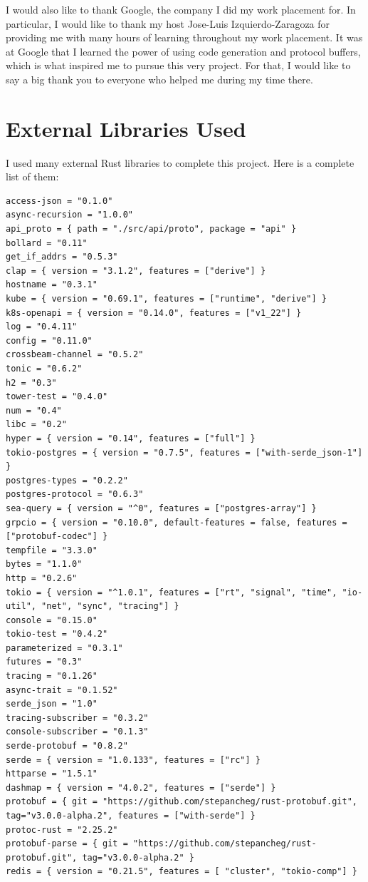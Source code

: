 \documentclass[a4paper,12pt]{report}
\begin{document}
I would also like to thank Google, the company I did my work placement for.
In particular, I would like to thank my host Jose-Luis Izquierdo-Zaragoza for providing me with many hours of learning throughout my work placement.
It was at Google that I learned the power of using code generation and protocol buffers, which is what inspired me to pursue this very project.
For that, I would like to say a big thank you to everyone who helped me during my time there.

\chapter*{External Libraries Used}
I used many external Rust libraries to complete this project. Here is a complete list of them:

\begin{lstlisting}
access-json = "0.1.0"
async-recursion = "1.0.0"
api_proto = { path = "./src/api/proto", package = "api" }
bollard = "0.11"
get_if_addrs = "0.5.3"
clap = { version = "3.1.2", features = ["derive"] }
hostname = "0.3.1"
kube = { version = "0.69.1", features = ["runtime", "derive"] }
k8s-openapi = { version = "0.14.0", features = ["v1_22"] }
log = "0.4.11"
config = "0.11.0"
crossbeam-channel = "0.5.2"
tonic = "0.6.2"
h2 = "0.3"
tower-test = "0.4.0"
num = "0.4"
libc = "0.2"
hyper = { version = "0.14", features = ["full"] }
tokio-postgres = { version = "0.7.5", features = ["with-serde_json-1"] }
postgres-types = "0.2.2"
postgres-protocol = "0.6.3"
sea-query = { version = "^0", features = ["postgres-array"] }
grpcio = { version = "0.10.0", default-features = false, features = ["protobuf-codec"] }
tempfile = "3.3.0"
bytes = "1.1.0"
http = "0.2.6"
tokio = { version = "^1.0.1", features = ["rt", "signal", "time", "io-util", "net", "sync", "tracing"] }
console = "0.15.0"
tokio-test = "0.4.2"
parameterized = "0.3.1"
futures = "0.3"
tracing = "0.1.26"
async-trait = "0.1.52"
serde_json = "1.0"
tracing-subscriber = "0.3.2"
console-subscriber = "0.1.3"
serde-protobuf = "0.8.2"
serde = { version = "1.0.133", features = ["rc"] }
httparse = "1.5.1"
dashmap = { version = "4.0.2", features = ["serde"] }
protobuf = { git = "https://github.com/stepancheg/rust-protobuf.git", tag="v3.0.0-alpha.2", features = ["with-serde"] }
protoc-rust = "2.25.2"
protobuf-parse = { git = "https://github.com/stepancheg/rust-protobuf.git", tag="v3.0.0-alpha.2" }
redis = { version = "0.21.5", features = [ "cluster", "tokio-comp"] }
\end{lstlisting}
\end{document}
